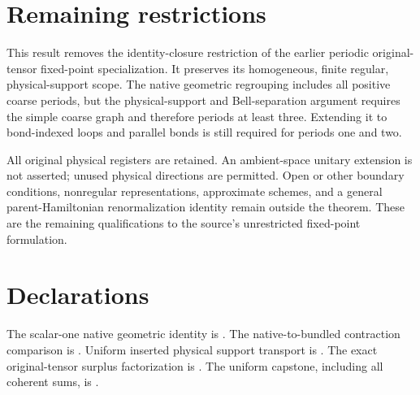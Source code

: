 \documentclass{article}
\begin{document}
\section{Remaining restrictions}
This result removes the identity-closure restriction of the earlier
periodic original-tensor fixed-point specialization. It preserves its
homogeneous, finite regular, physical-support scope. The native geometric
regrouping includes all positive coarse periods, but the physical-support
and Bell-separation argument requires the simple coarse graph and therefore
periods at least three. Extending it to bond-indexed loops and parallel
bonds is still required for periods one and two.

All original physical registers are retained. An ambient-space unitary
extension is not asserted; unused physical directions are permitted.
Open or other boundary conditions, nonregular representations, approximate
schemes, and a general parent-Hamiltonian renormalization identity remain
outside the theorem. These are the remaining qualifications to the source's
unrestricted fixed-point formulation.

\section{Declarations}
The scalar-one native geometric identity is
.
The native-to-bundled contraction comparison is
.
Uniform inserted physical support transport is
.
The exact original-tensor surplus factorization is
.
The uniform capstone, including all coherent sums, is
.
\end{document}
